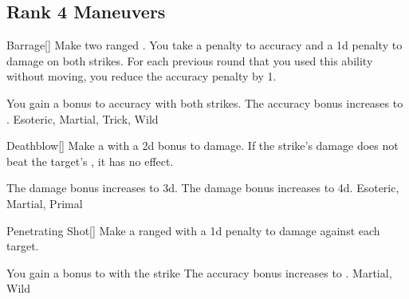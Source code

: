 \subsection{Rank 4 Maneuvers}

\lowercase{\hypertarget{maneuver:Barrage}{}}\label{maneuver:Barrage}
\hypertarget{maneuver:Barrage}{}
\begin{freeability}[Rank 4]{Barrage}[]
Make two ranged .
You take a  penalty to accuracy and a \minus1d penalty to damage on both strikes.
For each previous round that you used this ability without moving, you reduce the accuracy penalty by 1.

\rankline
{} You gain a  bonus to accuracy with both strikes.
 The accuracy bonus increases to .
 Esoteric, Martial, Trick, Wild
\end{freeability}
\vspace{0.25em}



\lowercase{\hypertarget{maneuver:Deathblow}{}}\label{maneuver:Deathblow}
\hypertarget{maneuver:Deathblow}{}
\begin{freeability}[Rank 4]{Deathblow}[]
Make a  with a \plus2d bonus to damage.
If the strike's damage does not beat the target's , it has no effect.

\rankline
{} The damage bonus increases to \plus3d.
 The damage bonus increases to \plus4d.
 Esoteric, Martial, Primal
\end{freeability}
\vspace{0.25em}



\lowercase{\hypertarget{maneuver:Penetrating Shot}{}}\label{maneuver:Penetrating Shot}
\hypertarget{maneuver:Penetrating Shot}{}
\begin{freeability}[Rank 4]{Penetrating Shot}[]
Make a ranged  with a \minus1d penalty to damage against each target.

\rankline
{} You gain a  bonus to  with the strike
 The accuracy bonus increases to .
 Martial, Wild
\end{freeability}
\vspace{0.25em}



